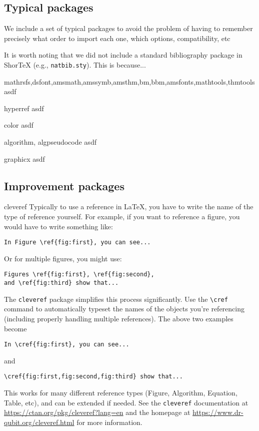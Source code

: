 \documentclass{article}
\begin{document}
\subsection{Typical packages}
We include a set of typical packages to avoid the problem of having to remember precisely
what order to import each one, which options, compatibility, etc

It is worth noting that we did not include a standard bibliography package in ShorTeX (e.g., \verb!natbib.sty!).
This is because...

\bdesc
\item[mathrsfs,dsfont,amsmath,amssymb,amsthm,bm,bbm,amsfonts,mathtools,thmtools] asdf
\item[hyperref] asdf
\item[color] asdf
\item[algorithm, algpseudocode] asdf
\item[graphicx] asdf
\edesc
\subsection{Improvement packages}
\bdesc
\item[cleveref] Typically to use a reference in \LaTeX, you have to write the name of the type of reference
yourself. For example, if you want to reference a figure, you would have to write something like:
\begin{verbatim}
In Figure \ref{fig:first}, you can see...
\end{verbatim}
Or for multiple figures, you might use:
\begin{verbatim}
Figures \ref{fig:first}, \ref{fig:second}, 
and \ref{fig:third} show that...
\end{verbatim}

The \texttt{cleveref} package simplifies this process significantly. Use the \verb!\cref! command to automatically
typeset the names of the objects you're referencing (including properly handling multiple references). The 
above two examples become
\begin{verbatim}
In \cref{fig:first}, you can see...
\end{verbatim}
and
\begin{verbatim}
\cref{fig:first,fig:second,fig:third} show that...
\end{verbatim}

This works for many different reference types (Figure, Algorithm, Equation, Table, etc),
and can be extended if needed. See the \texttt{cleveref} documentation 
at \url{https://ctan.org/pkg/cleveref?lang=en} and the homepage at \url{https://www.dr-qubit.org/cleveref.html} 
for more information.
\end{document}

